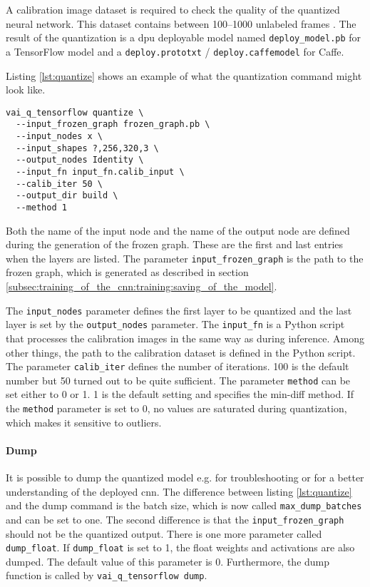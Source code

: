 A calibration image dataset is required to check the quality of the quantized neural network.
This dataset contains between \numrange{100}{1000} unlabeled frames \cite{vitis_ai_user_guide}.
The result of the quantization is a \acrshort{dpu} deployable model named \texttt{deploy\_model.pb} for a TensorFlow model and a \texttt{deploy.prototxt} / \texttt{deploy.caffemodel} for Caffe.

Listing \ref{lst:quantize} shows an example of what the quantization command might look like.

\begin{lstlisting}[style=bash, caption={Quantize command}, label=lst:quantize]
  vai_q_tensorflow quantize \
  --input_frozen_graph frozen_graph.pb \
  --input_nodes x \
  --input_shapes ?,256,320,3 \
  --output_nodes Identity \
  --input_fn input_fn.calib_input \
  --calib_iter 50 \
  --output_dir build \
  --method 1
\end{lstlisting}

Both the name of the input node and the name of the output node are defined during the generation of the frozen graph.
These are the first and last entries when the layers are listed.
The parameter \texttt{input\_frozen\_graph} is the path to the frozen graph, which is generated as described in section \ref{subsec:training_of_the_cnn:training:saving_of_the_model}.

The \texttt{input\_nodes} parameter defines the first layer to be quantized and the last layer is set by the \texttt{output\_nodes} parameter.
The \texttt{input\_fn} is a Python script that processes the calibration images in the same way as during inference.
Among other things, the path to the calibration dataset is defined in the Python script.
The parameter \texttt{calib\_iter} defines the number of iterations.
100 is the default number but 50 turned out to be quite sufficient.
The parameter \texttt{method} can be set either to 0 or 1.
1 is the default setting and specifies the min-diff method.
If the \texttt{method} parameter is set to 0, no values are saturated during quantization, which makes it sensitive to outliers.

\paragraph{Dump}
It is possible to dump the quantized model e.g. for troubleshooting or for a better understanding of the deployed \acrshort{cnn}.
The difference between listing \ref{lst:quantize} and the dump command is the batch size, which is now called \texttt{max\_dump\_batches} and can be set to one.
The second difference is that the \texttt{input\_frozen\_graph} should not be the quantized output.
There is one more parameter called \texttt{dump\_float}.
If \texttt{dump\_float} is set to 1, the float weights and activations are also dumped.
The default value of this parameter is 0.
Furthermore, the dump function is called by \texttt{vai\_q\_tensorflow dump}.

